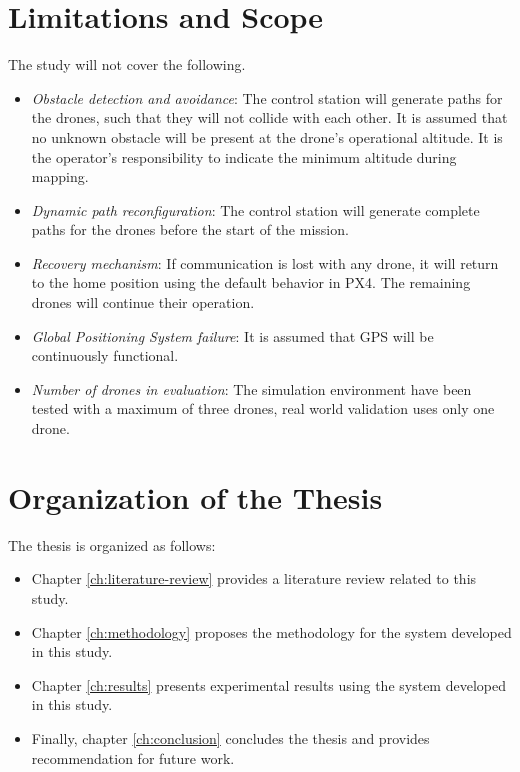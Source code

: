 \section{Limitations and Scope}

The study will not cover the following.
\begin{itemize}
	\item \textit{Obstacle detection and avoidance}: The control station will generate paths for the drones, such that they will not collide with each other. It is assumed that no unknown obstacle will be present at the drone's operational altitude. It is the operator's responsibility to indicate the minimum altitude during mapping.
	
	\item \textit{Dynamic path reconfiguration}: The control station will generate complete paths for the drones before the start of the mission.
	
	\item \textit{Recovery mechanism}: If communication is lost with any drone, it will return to the home position using the default behavior in PX4. The remaining drones will continue their operation.
	
	\item \textit{Global Positioning System failure}: It is assumed that GPS will be continuously functional.
	
	\item \textit{Number of drones in evaluation}: The simulation environment have been tested with a maximum of three drones, real world validation uses only one drone.
\end{itemize}

\section{Organization of the Thesis}

The thesis is organized as follows:
\begin{itemize}
	\item Chapter \ref{ch:literature-review} provides a literature review related to this study.
	\item Chapter \ref{ch:methodology} proposes the methodology for the system developed in this study.
	\item Chapter \ref{ch:results} presents experimental results using the system developed in this study.
	\item Finally, chapter \ref{ch:conclusion} concludes the thesis and provides recommendation for future work.
\end{itemize}

\FloatBarrier
